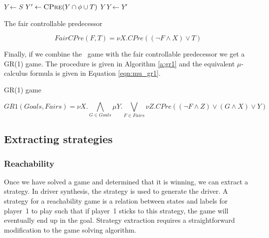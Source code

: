 \begin{algorithm}[t]
\begin{algorithmic}
\State $Y \gets S$
\Loop
\State $Y' \gets \Call{CPre}{Y \cap \phi \cup T}$
\State\Return $Y$\EndIf
\State $Y \gets Y'$
\EndLoop
\EndFunction
\end{algorithmic}
\caption{The fair controllable predecessor}
\label{a:fair_cpre}
\end{algorithm}

\begin{equation}
FairCPre(F, T) = \nu X. CPre((\neg F \wedge X) \vee T)
\label{eqn:mu_fair}
\end{equation}

Finally, if we combine the \buchi\ game with the fair controllable predecessor we get a GR(1) game. The procedure is given in Algorithm \ref{a:gr1} and the equivalent $\mu$-calculus formula is given in Equation \ref{eqn:mu_gr1}.

\begin{algorithm}[t]
\begin{algorithmic}
\State\Return {}
\EndFunction
\end{algorithmic}
\caption{GR(1) game}
\label{a:gr1}
\end{algorithm}

\begin{equation}
    GR1(Goals, Fairs) = \nu X. \bigwedge_{G \in Goals} \mu Y. \bigvee_{F \in Fairs} \nu Z. CPre((\neg F \wedge Z) \vee (G \wedge X) \vee Y)
\label{eqn:mu_gr1}
\end{equation}

\subsection{Extracting strategies}

\subsubsection{Reachability}

Once we have solved a game and determined that it is winning, we can extract a strategy. In driver synthesis, the strategy is used to generate the driver. A strategy for a reachability game is a relation between states and labels for player~1 to play such that if player~1 sticks to this strategy, the game will eventually end up in the goal. Strategy extraction requires a straightforward modification to the game solving algorithm.

